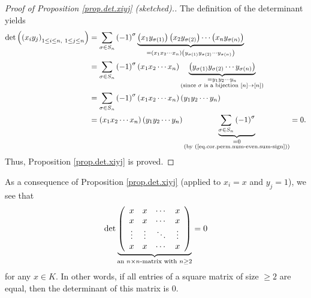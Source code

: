 \begin{proof}
[Proof of Proposition \ref{prop.det.xiyj} (sketched).]The definition of the
determinant yields%
\begin{align*}
\det\left(  \left(  x_{i}y_{j}\right)  _{1\leq i\leq n,\ 1\leq j\leq
n}\right)   &  =\sum_{\sigma\in S_{n}}\left(  -1\right)  ^{\sigma
}\underbrace{\left(  x_{1}y_{\sigma\left(  1\right)  }\right)  \left(
x_{2}y_{\sigma\left(  2\right)  }\right)  \cdots\left(  x_{n}y_{\sigma\left(
n\right)  }\right)  }_{=\left(  x_{1}x_{2}\cdots x_{n}\right)  \left(
y_{\sigma\left(  1\right)  }y_{\sigma\left(  2\right)  }\cdots y_{\sigma
\left(  n\right)  }\right)  }\\
&  =\sum_{\sigma\in S_{n}}\left(  -1\right)  ^{\sigma}\left(  x_{1}x_{2}\cdots
x_{n}\right)  \underbrace{\left(  y_{\sigma\left(  1\right)  }y_{\sigma\left(
2\right)  }\cdots y_{\sigma\left(  n\right)  }\right)  }_{\substack{=y_{1}%
y_{2}\cdots y_{n}\\\text{(since }\sigma\text{ is a bijection }\left[
n\right]  \rightarrow\left[  n\right]  \text{)}}}\\
&  =\sum_{\sigma\in S_{n}}\left(  -1\right)  ^{\sigma}\left(  x_{1}x_{2}\cdots
x_{n}\right)  \left(  y_{1}y_{2}\cdots y_{n}\right) \\
&  =\left(  x_{1}x_{2}\cdots x_{n}\right)  \left(  y_{1}y_{2}\cdots
y_{n}\right)  \underbrace{\sum_{\sigma\in S_{n}}\left(  -1\right)  ^{\sigma}%
}_{\substack{=0\\\text{(by (\ref{eq.cor.perm.num-even.sum-sign}))}}}=0.
\end{align*}
Thus, Proposition \ref{prop.det.xiyj} is proved.
\end{proof}

As a consequence of Proposition \ref{prop.det.xiyj} (applied to $x_{i}=x$ and
$y_{j}=1$), we see that%
\begin{equation}
\det\underbrace{\left(
\begin{array}
[c]{cccc}%
x & x & \cdots & x\\
x & x & \cdots & x\\
\vdots & \vdots & \ddots & \vdots\\
x & x & \cdots & x
\end{array}
\right)  }_{\text{an }n\times n\text{-matrix with }n\geq2}=0
\label{eq.prop.det.xiyj.cor-x}%
\end{equation}
for any $x\in K$. In other words, if all entries of a square matrix of size
$\geq2$ are equal, then the determinant of this matrix is $0$.

